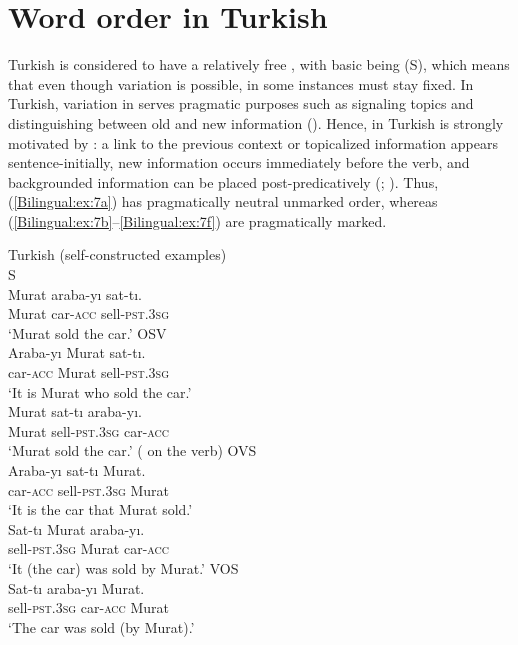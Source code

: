 \documentclass[output=paper,colorlinks,citecolor=brown]{langscibook}
\begin{document}
\section{Word order in Turkish}\label{Bilingual:ss:3}

Turkish is considered to have a relatively free , with basic  being (S), which means that even though  variation is possible, in some instances  must stay fixed. In Turkish, variation in  serves pragmatic purposes such as signaling topics and distinguishing between old and new information (\citealt{erguvanli1984function}). Hence,  in Turkish is strongly motivated by : a link to the previous context or topicalized information appears sentence-initially, new information occurs immediately before the verb, and backgrounded information can be placed post-predicatively (\citealt{erguvanli1984function}; \citealt{kornfilt1997turkish}). Thus, (\ref{Bilingual:ex:7a}) has pragmatically neutral unmarked order, whereas (\ref{Bilingual:ex:7b}–\ref{Bilingual:ex:7f}) are pragmatically marked. 

\ea
\ea\label{Bilingual:ex:7a} 
Turkish (self-constructed examples) \\
S \\
\gll Murat araba-yı sat-tı. \\ 
Murat car\textsc{-acc} sell\textsc{-pst.3sg} \\
\glt `Murat sold the car.'
\ex\label{Bilingual:ex:7b}
OSV \\
\gll Araba-yı Murat sat-tı. \\
car\textsc{-acc} Murat sell\textsc{-pst.3sg} \\
\glt `It is Murat who sold the car.'
\ex\label{Bilingual:ex:7c} 
 \\
\gll Murat sat-tı araba-yı. \\
Murat sell\textsc{-pst.3sg} car\textsc{-acc} \\
\glt `Murat sold the car.' ( on the verb)
\ex\label{Bilingual:ex:7d} 
OVS \\
\gll Araba-yı sat-tı Murat. \\
car\textsc{-acc} sell\textsc{-pst.3sg} Murat \\
\glt `It is the car that Murat sold.'
\ex\label{Bilingual:ex:7e} 
 \\
\gll Sat-tı Murat araba-yı. \\
sell\textsc{-pst.3sg} Murat car\textsc{-acc} \\
\glt `It (the car) was sold by Murat.'
\ex\label{Bilingual:ex:7f} 
VOS\\
\gll Sat-tı araba-yı Murat. \\
sell\textsc{-pst.3sg} car\textsc{-acc} Murat \\
\glt `The car was sold (by Murat).'
\z
\z
\end{document}

